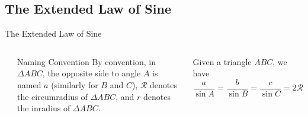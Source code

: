 \documentclass{beamer}
\begin{document}
\subsection{The Extended Law of Sine}
\begin{frame}{The Extended Law of Sine}
	\begin{columns}
		\begin{center}
		\end{center}
		\begin{exampleblock}{Naming Convention}
			By convention, in $\Delta ABC$, the opposite side to angle $A$ is named $a$ (similarly for $B$ and $C$), $\mathcal{R}$ denotes the circumradius of $\Delta ABC$, and $r$ denotes the inradius of $\Delta ABC$.
		\end{exampleblock}
		\begin{theorem}
			Given a triangle $ABC$, we have 
			\begin{equation*}
				\frac{a}{\sin A} = \frac{b}{\sin B} = \frac{c}{\sin C} = 2\mathcal{R}
			\end{equation*}
		\end{theorem}
	\end{columns}	
\end{frame}
\end{document}
